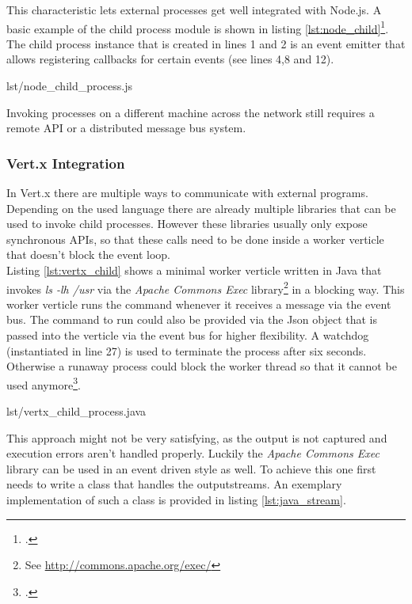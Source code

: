 This characteristic lets external processes get well integrated with Node.js.
A basic example of the child process module is shown in listing \ref{lst:node_child}\footcite[Taken from][]{node_child_process}.
The child process instance that is created in lines 1 and 2 is an event emitter that
allows registering callbacks for certain events (see lines 4,8 and 12).

%
{lst/node_child_process.js}


Invoking processes on a different machine across the network still
requires a remote API or a distributed message bus system.


\subsubsection{Vert.x Integration}
\label{vertx_integration}
In Vert.x there are multiple ways to communicate with external programs.
Depending on the used language there are already multiple libraries that can be
used to invoke child processes. However these libraries usually only expose
synchronous APIs, so that these calls need to be done inside a worker verticle
that doesn't block the event loop.\\
Listing \ref{lst:vertx_child} shows a minimal worker verticle written in Java
that invokes \textit{ls -lh /usr} via the \textit{Apache Commons Exec}
library\footnote{See \url{http://commons.apache.org/exec/}} in a blocking way.
This worker verticle runs the command whenever it receives a message via the event bus.
The command to run could also be provided via the Json object that is passed
into the verticle via the event bus for higher flexibility. A watchdog
(instantiated in line 27) is used to terminate the process after six seconds.
Otherwise a runaway process could block the worker thread so that it cannot be
used anymore\footcite[Cf.][67]{Evi_2007}.

%
{lst/vertx_child_process.java}

This approach might not be very satisfying, as the output is not captured and
execution errors aren't handled properly. Luckily the \textit{Apache Commons Exec} library
can be used in an event driven style as well. To achieve this one first needs to
write a class that handles the outputstreams.
An exemplary implementation of such a class is provided in listing
\ref{lst:java_stream}.

